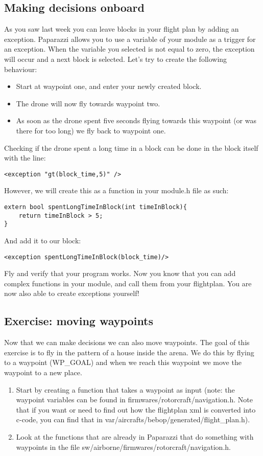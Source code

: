 \documentclass{article}
\begin{document}
\subsection*{Making decisions onboard}
As you saw last week you can leave blocks in your flight plan by adding an exception. Paparazzi allows you to use a variable of your module as a trigger for an exception. When the variable you selected is not equal to zero, the exception will occur and a next block is selected. 
Let's try to create the following behaviour: 
\begin{itemize}
\item Start at waypoint one, and enter your newly created block. 
\item The drone will now fly towards waypoint two. 
\item As soon as the drone spent five seconds flying towards this waypoint (or was there for too long) we fly back to waypoint one. 
\end{itemize}
Checking if the drone spent a long time in a block can be done in the block itself with the line:
\begin{verbatim}
<exception "gt(block_time,5)" /> 
\end{verbatim}
However, we will create this as a function in your module.h file as such:
\begin{verbatim}
extern bool spentLongTimeInBlock(int timeInBlock){
	return timeInBlock > 5;
}
\end{verbatim}
And add it to our block:
\begin{verbatim}
<exception spentLongTimeInBlock(block_time)/>
\end{verbatim}
Fly and verify that your program works. Now you know that you can add complex functions in your module, and call them from your flightplan. 
You are now also able to create exceptions yourself!

\subsection*{Exercise: moving waypoints}
Now that we can make decisions we can also move waypoints. The goal of this exercise is to fly in the pattern of a house inside the arena. 
We do this by flying to a waypoint (WP\_GOAL) and when we reach this waypoint we move the waypoint to a new place. 

\begin{enumerate}
\item Start by creating a function that takes a waypoint as input (note: the waypoint variables can be found in firmwares/rotorcraft/navigation.h. Note that if you want or need to find out how the flightplan xml is converted into c-code, you can find that in var/aircrafts/bebop/generated/flight\_plan.h).
\item Look at the functions that are already in Paparazzi that do something with waypoints in the file sw/airborne/firmwares/rotorcraft/navigation.h. 
\end{enumerate}
\end{document}
